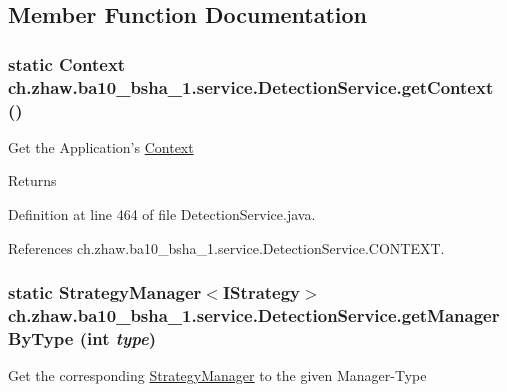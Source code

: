 \subsection{Member Function Documentation}
\hypertarget{classch_1_1zhaw_1_1ba10__bsha__1_1_1service_1_1DetectionService_a70a305c4eec817ca91cf711732f52e2a}{
\subsubsection[{getContext}]{\setlength{\rightskip}{0pt plus 5cm}static Context ch.zhaw.ba10\_\-bsha\_\-1.service.DetectionService.getContext ()}}
\label{classch_1_1zhaw_1_1ba10__bsha__1_1_1service_1_1DetectionService_a70a305c4eec817ca91cf711732f52e2a}
Get the Application's \hyperlink{}{Context}

\begin{DoxyReturn}{Returns}

\end{DoxyReturn}


Definition at line 464 of file DetectionService.java.

References ch.zhaw.ba10\_\-bsha\_\-1.service.DetectionService.CONTEXT.\hypertarget{classch_1_1zhaw_1_1ba10__bsha__1_1_1service_1_1DetectionService_a6ad4b4b98cda7ec8ebfb0420f93e03dd}{
\subsubsection[{getManagerByType}]{\setlength{\rightskip}{0pt plus 5cm}static StrategyManager$<${\bf IStrategy}$>$ ch.zhaw.ba10\_\-bsha\_\-1.service.DetectionService.getManagerByType (int {\em type})}}
\label{classch_1_1zhaw_1_1ba10__bsha__1_1_1service_1_1DetectionService_a6ad4b4b98cda7ec8ebfb0420f93e03dd}
Get the corresponding \hyperlink{}{StrategyManager} to the given Manager-\/Type


